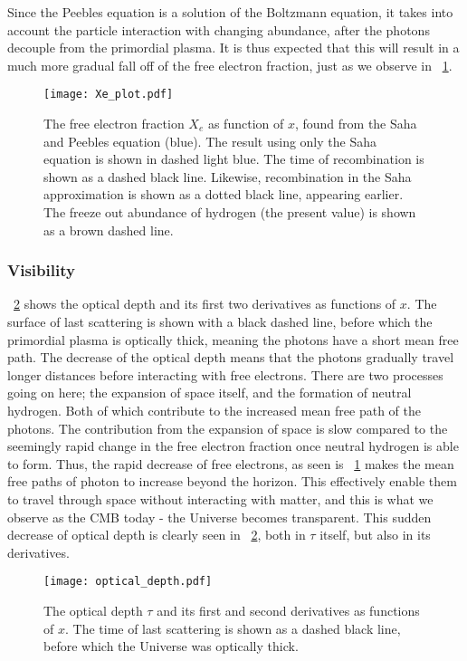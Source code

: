     Since the Peebles equation is a solution of the Boltzmann equation, it takes into account the particle interaction with changing abundance, after the photons decouple from the primordial plasma. It is thus expected that this will result in a much more gradual fall off of the free electron fraction, just as we observe in ~\cref{fig:m2:electron_fraction}.
    \begin{figure}
        \texttt{[image: Xe\_plot.pdf]}
        \caption{The free electron fraction $X_e$ as function of $x$, found from the Saha and Peebles equation (blue). The result using only the Saha equation is shown in dashed light blue. The time of recombination is shown as a dashed black line. Likewise, recombination in the Saha approximation is shown as a dotted black line, appearing earlier. The freeze out abundance of hydrogen (the present value) is shown as a brown dashed line.}
        \label{fig:m2:electron_fraction}
    \end{figure}

    \subsubsection{Visibility}

    ~\cref{fig:m2:optical_depth} shows the optical depth and its first two derivatives as functions of $x$. The surface of last scattering is shown with a black dashed line, before which the primordial plasma is optically thick, meaning the photons have a short mean free path. The decrease of the optical depth means that the photons gradually travel longer distances before interacting with free electrons. There are two processes going on here; the expansion of space itself, and the formation of neutral hydrogen. Both of which contribute to the increased mean free path of the photons. The contribution from the expansion of space is slow compared to the seemingly rapid change in the free electron fraction once neutral hydrogen is able to form. Thus, the rapid decrease of free electrons, as seen is ~\cref{fig:m2:electron_fraction} makes the mean free paths of photon to increase beyond the horizon. This effectively enable them to travel through space without interacting with matter, and this is what we observe as the CMB today - the Universe becomes transparent. This sudden decrease of optical depth is clearly seen in ~\cref{fig:m2:optical_depth}, both in $\tau$ itself, but also in its derivatives.
    \begin{figure}
        \texttt{[image: optical\_depth.pdf]}
        \caption{The optical depth $\tau$ and its first and second derivatives as functions of $x$. The time of last scattering is shown as a dashed black line, before which the Universe was optically thick.}
        \label{fig:m2:optical_depth}
    \end{figure}

